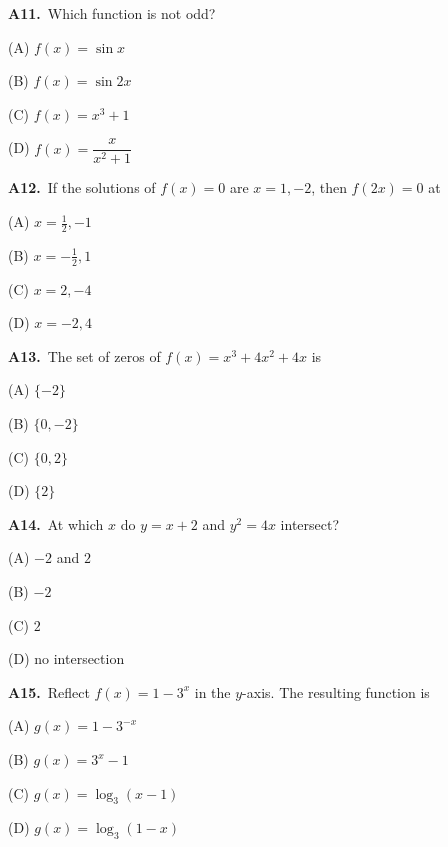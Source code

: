 \documentclass[11pt]{article}
\begin{document}
\bigskip\noindent\textbf{A11.}\ Which function is not odd?
\begin{list}{}{\setlength{\leftmargin}{3em}\setlength{\labelwidth}{2.5em}\setlength{\itemsep}{0pt}\setlength{\topsep}{2pt}}
\item[(A)] $f(x)=\sin x$
\item[(B)] $f(x)=\sin2x$
\item[(C)] $f(x)=x^3+1$
\item[(D)] $f(x)=\dfrac{x}{x^2+1}$
\end{list}

\bigskip\noindent\textbf{A12.}\ If the solutions of $f(x)=0$ are $x=1,-2$, then $f(2x)=0$ at
\begin{list}{}{\setlength{\leftmargin}{3em}\setlength{\labelwidth}{2.5em}\setlength{\itemsep}{0pt}\setlength{\topsep}{2pt}}
\item[(A)] $x=\frac12,-1$
\item[(B)] $x=-\frac12,1$
\item[(C)] $x=2,-4$
\item[(D)] $x=-2,4$
\end{list}

\bigskip\noindent\textbf{A13.}\ The set of zeros of $f(x)=x^3+4x^2+4x$ is
\begin{list}{}{\setlength{\leftmargin}{3em}\setlength{\labelwidth}{2.5em}\setlength{\itemsep}{0pt}\setlength{\topsep}{2pt}}
\item[(A)] $\{-2\}$
\item[(B)] $\{0,-2\}$
\item[(C)] $\{0,2\}$
\item[(D)] $\{2\}$
\end{list}

\bigskip\noindent\textbf{A14.}\ At which $x$ do $y=x+2$ and $y^2=4x$ intersect?
\begin{list}{}{\setlength{\leftmargin}{3em}\setlength{\labelwidth}{2.5em}\setlength{\itemsep}{0pt}\setlength{\topsep}{2pt}}
\item[(A)] $-2$ and $2$
\item[(B)] $-2$
\item[(C)] $2$
\item[(D)] no intersection
\end{list}

\bigskip\noindent\textbf{A15.}\ Reflect $f(x)=1-3^x$ in the $y$-axis. The resulting function is
\begin{list}{}{\setlength{\leftmargin}{3em}\setlength{\labelwidth}{2.5em}\setlength{\itemsep}{0pt}\setlength{\topsep}{2pt}}
\item[(A)] $g(x)=1-3^{-x}$
\item[(B)] $g(x)=3^x-1$
\item[(C)] $g(x)=\log_3(x-1)$
\item[(D)] $g(x)=\log_3(1-x)$
\end{list}
\end{document}

